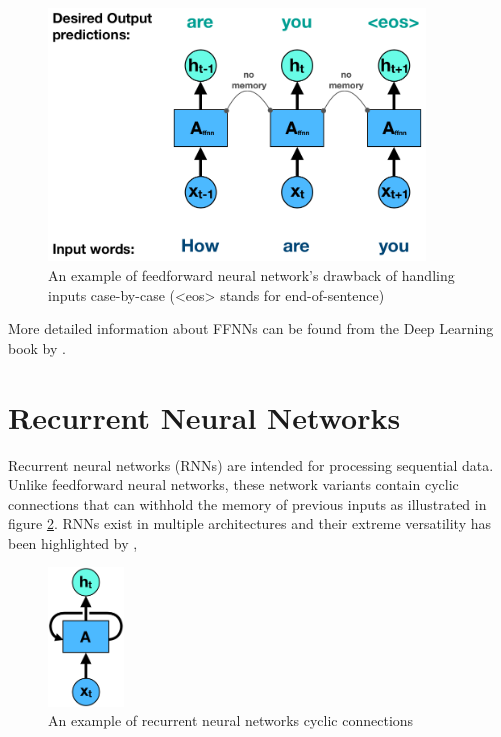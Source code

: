 \begin{figure}[h]
    \centering
    \includegraphics[width=10cm,height=\textheight,keepaspectratio]{ffnn_case_by_case}
    \caption{An example of feedforward neural network's drawback of handling inputs case-by-case (<eos> stands for end-of-sentence)}
    \label{fig:ffnn_case_by_case}
\end{figure}


More detailed information about FFNNs can be found from the Deep Learning book by \textcite{goodfellow2016deep}.


\section{Recurrent Neural Networks}

Recurrent neural networks (RNNs) are intended for processing sequential data. Unlike feedforward neural networks, these network variants contain cyclic connections that can withhold the memory of previous inputs as illustrated in figure \ref{fig:rnn_cycle}. RNNs exist in multiple architectures and their extreme versatility has been highlighted by \textcite{goodfellow2016deep}, 

\begin{figure}[h]
    \centering
    \includegraphics[width=2cm,height=\textheight,keepaspectratio]{rnn_cycle}
    \caption{An example of recurrent neural networks cyclic connections}
    \label{fig:rnn_cycle}
\end{figure}

